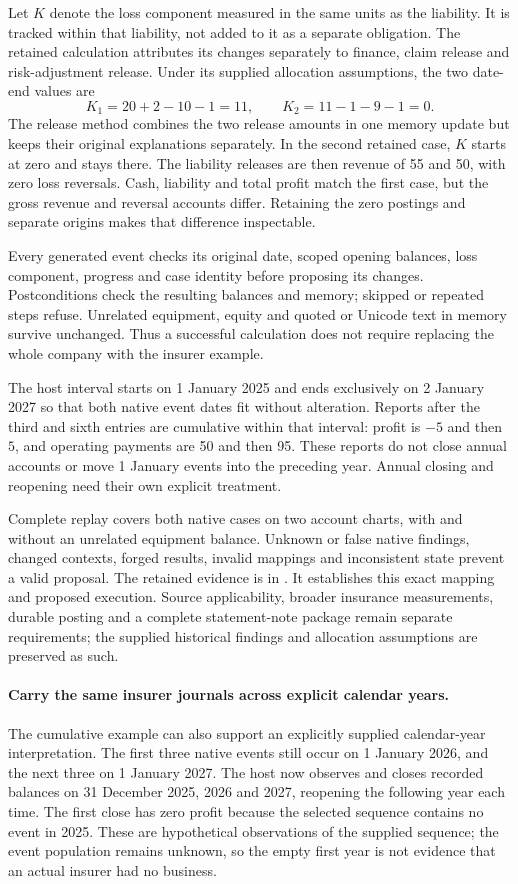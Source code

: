 Let $K$ denote the loss component measured in the same units as the liability.
It is tracked within that liability, not added to it as a separate obligation.
The retained calculation attributes its changes separately to finance, claim
release and risk-adjustment release. Under its supplied allocation assumptions,
the two date-end values are
\[
  K_1=20+2-10-1=11,\qquad
  K_2=11-1-9-1=0.
\]
The release method combines the two release amounts in one memory update but
keeps their original explanations separately. In the second retained case,
$K$ starts at zero and stays there. The liability releases are then revenue
of 55 and 50, with zero loss reversals. Cash, liability and total profit match
the first case, but the gross revenue and reversal accounts differ. Retaining
the zero postings and separate origins makes that difference inspectable.

Every generated event checks its original date, scoped opening balances,
loss component, progress and case identity before proposing its changes.
Postconditions check the resulting balances and memory; skipped or repeated
steps refuse. Unrelated equipment, equity and quoted or Unicode text in memory
survive unchanged. Thus a successful calculation does not require replacing
the whole company with the insurer example.

The host interval starts on 1 January 2025 and ends exclusively on
2 January 2027 so that both native event dates fit without alteration. Reports
after the third and sixth entries are cumulative within that interval: profit
is $-5$ and then $5$, and operating payments are 50 and then 95. These reports
do not close annual accounts or move 1 January events into the preceding year.
Annual closing and reopening need their own explicit treatment.

Complete replay covers both native cases on two account charts, with and
without an unrelated equipment balance. Unknown or false native findings,
changed contexts, forged results, invalid mappings and inconsistent state
prevent a valid proposal. The retained evidence is in
.
It establishes this exact mapping and proposed execution. Source applicability,
broader insurance measurements, durable posting and a complete statement-note
package remain separate requirements; the supplied historical findings and
allocation assumptions are preserved as such.


\paragraph{Carry the same insurer journals across explicit calendar years.}
The cumulative example can also support an explicitly supplied calendar-year
interpretation. The first three native events still occur on 1 January 2026,
and the next three on 1 January 2027. The host now observes and closes recorded
balances on 31 December 2025, 2026 and 2027, reopening the following year each
time. The first close has zero profit because the selected sequence contains
no event in 2025. These are hypothetical observations of the supplied sequence;
the event population remains unknown, so the empty first year is not evidence
that an actual insurer had no business.

